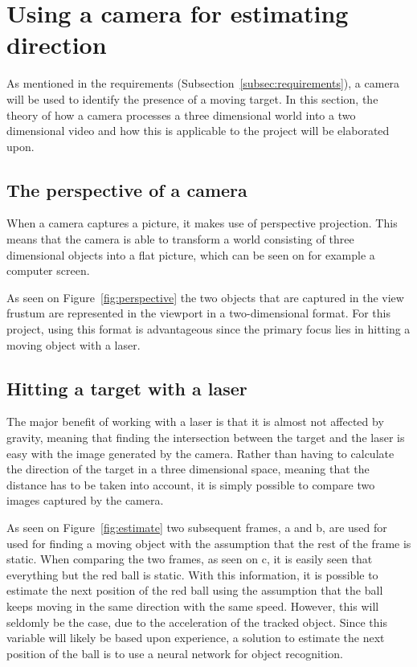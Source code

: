\section{Using a camera for estimating direction}
As mentioned in the requirements (Subsection~\ref{subsec:requirements}), a camera will be used to identify the presence of a moving target.
In this section, the theory of how a camera processes a three dimensional world into a two dimensional video and how this is applicable to the project will be elaborated upon.

\subsection{The perspective of a camera}
When a camera captures a picture, it makes use of perspective projection.
This means that the camera is able to transform a world consisting of three dimensional objects into a flat picture, which can be seen on for example a computer screen.


As seen on Figure~\ref{fig:perspective} the two objects that are captured in the view frustum are represented in the viewport in a two-dimensional format.
For this project, using this format is advantageous since the primary focus lies in hitting a moving object with a laser.

\subsection{Hitting a target with a laser}
The major benefit of working with a laser is that it is almost not affected by gravity, meaning that finding the intersection between the target and the laser is easy with the image generated by the camera.
Rather than having to calculate the direction of the target in a three dimensional space, meaning that the distance has to be taken into account, it is simply possible to compare two images captured by the camera.

As seen on Figure~\ref{fig:estimate} two subsequent frames, a and b, are used for used for finding a moving object with the assumption that the rest of the frame is static. 
When comparing the two frames, as seen on c, it is easily seen that everything but the red ball is static.
With this information, it is possible to estimate the next position of the red ball using the assumption that the ball keeps moving in the same direction with the same speed.
However, this will seldomly be the case, due to the acceleration of the tracked object.
Since this variable will likely be based upon experience, a solution to estimate the next position of the ball is to use a neural network for object recognition.